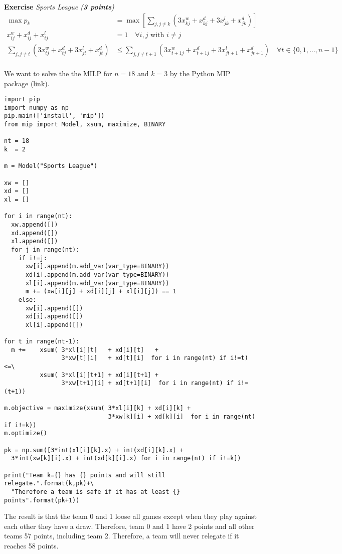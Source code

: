 \documentclass[a4paper,10pt]{article}
\newcounter{exc}
\newenvironment{exercise}[1]%
{\refstepcounter{exc}\textbf{Exercise \arabic{exc}} \emph{#1}\\}
{

\hrulefill\medskip}%
\begin{document}
\begin{exercise}{Sports League (\textbf{3 points})}
\begin{align}
  \max p_k &= \max \left[ \sum_{j,j\neq k} (3x^w_{kj}+ x^d_{kj} + 3x^l_{jk}+ x^d_{jk}) \right] \\
  x^w_{ij}+ x^d_{ij}+ x^l_{ij}& = 1 \quad \forall i,j \text{ with } i \neq j \\
  \sum_{j,j\neq t} (3x^w_{tj}+ x^d_{tj} + 3x^l_{jt}+ x^d_{jt})& \leq 
  \sum_{j,j\neq t+1} (3x^w_{t+1j}+ x^d_{t+1j} + 3x^l_{jt+1}+ x^d_{jt+1}) \quad \forall t\in\{0,1,...,n-1\}\\
\end{align}

We want to solve the the MILP for $n=18$ and $k=3$ by the Python MIP package (\href{https://pypi.org/project/mip/}{link}).


\begin{lstlisting}[style = Python]
import pip
import numpy as np
pip.main(['install', 'mip'])
from mip import Model, xsum, maximize, BINARY

nt = 18
k  = 2

m = Model("Sports League")

xw = []
xd = []
xl = []

for i in range(nt):
  xw.append([])
  xd.append([])
  xl.append([])
  for j in range(nt):
    if i!=j:
      xw[i].append(m.add_var(var_type=BINARY))
      xd[i].append(m.add_var(var_type=BINARY))
      xl[i].append(m.add_var(var_type=BINARY))
      m += (xw[i][j] + xd[i][j] + xl[i][j]) == 1
    else:
      xw[i].append([])
      xd[i].append([])
      xl[i].append([])

for t in range(nt-1):
  m +=    xsum( 3*xl[i][t]   + xd[i][t]   +
                3*xw[t][i]   + xd[t][i]  for i in range(nt) if i!=t) <=\
          xsum( 3*xl[i][t+1] + xd[i][t+1] +
                3*xw[t+1][i] + xd[t+1][i]  for i in range(nt) if i!=(t+1))

m.objective = maximize(xsum( 3*xl[i][k] + xd[i][k] +
                             3*xw[k][i] + xd[k][i]  for i in range(nt) if i!=k))
m.optimize()

pk = np.sum([3*int(xl[i][k].x) + int(xd[i][k].x) +
  3*int(xw[k][i].x) + int(xd[k][i].x) for i in range(nt) if i!=k])

print("Team k={} has {} points and will still relegate.".format(k,pk)+\
  "Therefore a team is safe if it has at least {} points".format(pk+1))
\end{lstlisting}
The result is that the team 0 and 1 loose all games except when they play against each other they have a draw. Therefore, team 0 and 1 have 2 points and all other teams 57 points, including team 2. Therefore, a team will never relegate if it reaches 58 points.
\end{exercise}
\end{document}
